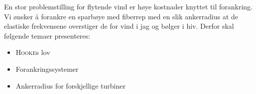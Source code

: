 En stor problemstilling for flytende vind er høye kostnader knyttet til forankring.
Vi ønsker å forankre en sparbøye med fiberrep med en slik ankerradius at de elastiske frekvensene overstiger de for vind i jag og bølger i hiv.
Derfor skal følgende temaer presenteres:
\begin{itemize}
\item \textsc{Hooke}s lov
\item Forankringssystemer
  \item Ankerradius for forskjellige turbiner
\end{itemize}

